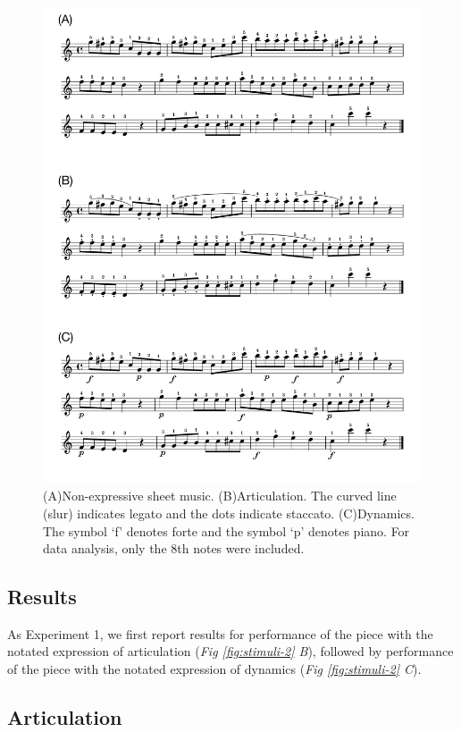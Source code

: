 \documentclass[
  man,floatsintext]{apa6}
\begin{document}
\begin{figure}
\includegraphics[width=1\linewidth]{manuscript_files/figure-latex/stim-2-1} \caption{\label{fig:stimuli-2}(A)Non-expressive sheet music. (B)Articulation. The curved line (slur) indicates legato and the dots indicate staccato. (C)Dynamics. The symbol `f' denotes forte and the symbol `p' denotes piano. For data analysis, only the 8th notes were included.}\label{fig:stim-2}
\end{figure}

\hypertarget{results-1}{%
\subsection{Results}\label{results-1}}

As Experiment 1, we first report results for performance of the piece with the notated expression of articulation (\emph{Fig \ref{fig:stimuli-2} B}), followed by performance of the piece with the notated expression of dynamics (\emph{Fig \ref{fig:stimuli-2} C}).

\hypertarget{articulation-1}{%
\subsection{Articulation}\label{articulation-1}}
\end{document}

